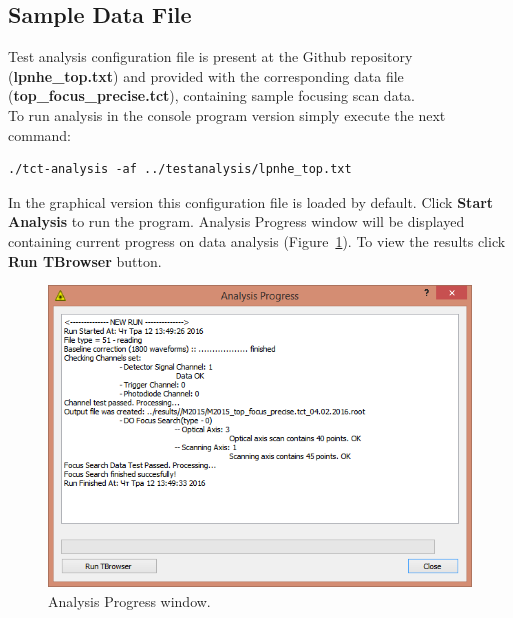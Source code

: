 \documentclass[12pt,oneside,notitlepage,abstracton,a4paper]{scrartcl}
\begin{document}
\subsection{Sample Data File}\label{usage:sample}

Test analysis configuration file is present at the Github repository (\textbf{lpnhe\_top.txt}) and provided with the corresponding data file (\textbf{top\_focus\_precise.tct}), containing sample focusing scan data.
\\ \indent To run analysis in the console program version simply execute the next command:
\begin{lstlisting}
./tct-analysis -af ../testanalysis/lpnhe_top.txt
\end{lstlisting}
In the graphical version this configuration file is loaded by default. Click \textbf{Start Analysis} to run the program. Analysis Progress window will be displayed containing current progress on data analysis (Figure~\ref{fig:progress_analysis}). To view the results click \textbf{Run TBrowser} button.

\begin{figure}[h]
    \centering
    \includegraphics[width=12cm]{pics/progress}
    \caption{Analysis Progress window.}
    \label{fig:progress_analysis}
\end{figure}
\end{document}

